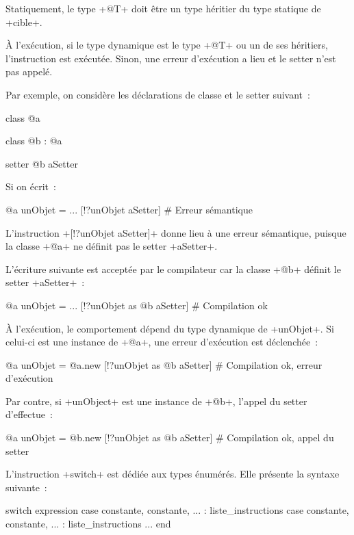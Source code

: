 Statiquement, le type \ggs+@T+ doit être un type héritier du type statique de \ggs+cible+.

À l'exécution, si le type dynamique est le type \ggs+@T+ ou un de ses héritiers, l'instruction est exécutée. Sinon, une erreur d'exécution a lieu et le setter n'est pas appelé.

Par exemple, on considère les déclarations de classe et le setter suivant~:

\begin{galgas}
class @a { }

class @b : @a { }

setter @b aSetter { }
\end{galgas}

Si on écrit~:
\begin{galgas}
@a unObjet = ...
[!?unObjet aSetter] # Erreur sémantique
\end{galgas}

L'instruction \ggs+[!?unObjet aSetter]+ donne lieu à une erreur sémantique, puisque la classe \ggs+@a+ ne définit pas le setter \ggs+aSetter+.

L'écriture suivante est acceptée par le compilateur car la classe \ggs+@b+ définit le setter \ggs+aSetter+~:
\begin{galgas}
@a unObjet = ...
[!?unObjet as @b aSetter] # Compilation ok
\end{galgas}

À l'exécution, le comportement dépend du type dynamique de \ggs+unObjet+. Si celui-ci est une instance de \ggs+@a+, une erreur d'exécution est déclenchée~:
\begin{galgas}
@a unObjet = @a.new
[!?unObjet as @b aSetter] # Compilation ok, erreur d'exécution
\end{galgas}


Par contre, si \ggs+unObject+ est une instance de \ggs+@b+, l'appel du setter d'effectue~:
\begin{galgas}
@a unObjet = @b.new
[!?unObjet as @b aSetter] # Compilation ok, appel du setter
\end{galgas}











L'instruction \ggs+switch+ est dédiée aux types énumérés. Elle présente la syntaxe suivante~:

\begin{galgas}
switch expression
case constante, constante, ... :
  liste_instructions
case constante, constante, ... :
  liste_instructions
...
end
\end{galgas}


